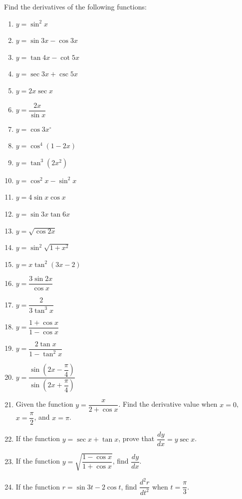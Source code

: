 \documentclass[12pt]{report}
\begin{document}
Find the derivatives of the following functions:
\setlength{\columnseprule}{1pt} \setlength{\columnsep}{24pt}
\begin{multicols}{2}
  \begin{enumerate}
    \item $y=\sin^{2}x$
    \item $y=\sin{3x}-\cos{3x}$
    \item $y=\tan4x-\cot5x$
    \item $y=\sec3x+\csc5x$
    \item $y=2x\sec x$
    \item $y=\dfrac{2x}{\sin x}$
    \item $y=\cos3x^{\circ}$
    \item $y=\cos^{4}(1-2x)$
    \item $y=\tan^{3}\left(2x^{2}\right)$
    \item $y=\cos^{2}x-\sin^{2}x$
    \item $y=4\sin x\cos x$
    \item $y=\sin3x\tan6x$
    \item $y=\sqrt{\cos2x}$
    \item $y=\sin^{2}\sqrt{1+x^{2}}$
    \item $y=x\tan^{2}(3x-2)$
    \item $y=\dfrac{3\sin2x}{\cos x}$
    \item $y={\dfrac{2}{3\tan^{3}x}}$
    \item $y={\dfrac{1+\cos x}{1-\cos x}}$
    \item $y={\dfrac{2\tan x}{1-\tan^{2}x}}$
    \item $y={\dfrac{\sin\left(2x-{\dfrac{\pi}{4}}\right)}{\sin\left(2x+{\dfrac{\pi}{4}}\right)}}$
  \end{enumerate}
\end{multicols}

\begin{enumerate}
  \setcounter{enumi}{20}
  \item Given the function $y = \dfrac{x}{2 + \cos x}$. Find the derivative value when
        $x = 0$, $x = \dfrac{\pi}{2}$, and $x = \pi$.
  \item If the function $y = \sec x + \tan x$, prove that $\dfrac{dy}{dx} = y\sec x$.
  \item If the function $y = \sqrt{\dfrac{1 - \cos x}{1 + \cos x}}$, find
        $\dfrac{dy}{dx}$.
  \item If the function $r = \sin 3t - 2\cos t$, find $\dfrac{d^2r}{dt^2}$ when $t =
          \dfrac{\pi}{3}$.
\end{enumerate}
\end{document}
